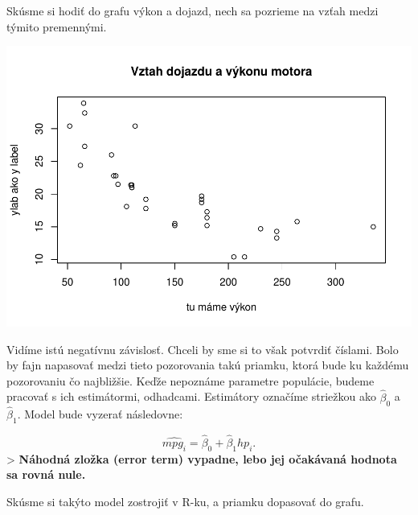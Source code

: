 Skúsme si hodiť do grafu výkon a dojazd, nech sa pozrieme na vzťah medzi
týmito premennými.

\begin{Shaded}
\begin{Highlighting}[]

\NormalTok{(}\OperatorTok{$}\OperatorTok{$} \NormalTok{, } 
\end{Highlighting}
\end{Shaded}

\includegraphics{test_files/figure-latex/unnamed-chunk-39-1.pdf}

Vidíme istú negatívnu závislosť. Chceli by sme si to však potvrdiť
číslami. Bolo by fajn napasovať medzi tieto pozorovania takú priamku,
ktorá bude ku každému pozorovaniu čo najbližšie. Keďže nepoznáme
parametre populácie, budeme pracovať s ich estimátormi, odhadcami.
Estimátory označíme striežkou ako \(\hat\beta_0{}\) a \(\hat\beta_1{}\).
Model bude vyzerať následovne:

\[\hat{mpg_i} = \hat\beta_0 + \hat \beta_1{hp_i}.\] \textgreater{}
\textbf{Náhodná zložka (error term) vypadne, lebo jej očakávaná hodnota
sa rovná nule.}

Skúsme si takýto model zostrojiť v R-ku, a priamku dopasovať do grafu.

